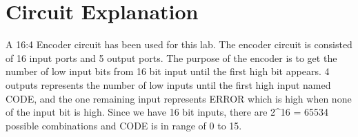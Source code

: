 \documentclass[Report1]{subfiles}
\begin{document}
\section{Circuit Explanation}
A 16:4 Encoder circuit has been used for this lab. The encoder circuit is consisted of 16 input ports and 5 output ports. The purpose of the encoder is to get the number of low input bits from 16 bit input until the first high bit appears. 4 outputs represents the number of low inputs until the first high input named CODE, and the one remaining input represents ERROR which is high when none of the input bit is high. Since we have 16 bit inputs, there are 2^16 = 65534 possible combinations and CODE is in range of 0 to 15.
\end{document}
